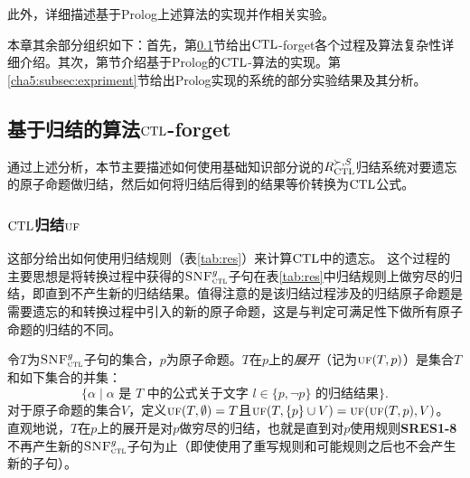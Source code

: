 此外，详细描述基于Prolog上述算法的实现并作相关实验。

本章其余部分组织如下：首先，第\ref{cha5:subsec:resf}节给出$\textrm{CTL}$-forget各个过程及算法复杂性详细介绍。其次，第\label{cha5:subsec:prolog}节介绍基于Prolog的$\textrm{CTL}$-算法的实现。第\ref{cha5:subsec:expriment}节给出Prolog实现的系统的部分实验结果及其分析。
\subsection{基于归结的算法$\textrm{CTL}$-forget}
\label{cha5:subsec:resf}
通过上述分析，本节主要描述如何使用基础知识部分说的$R_{\textrm{CTL}}^{\succ,S}$归结系统对要遗忘的原子命题做归结，然后如何将归结后得到的结果等价转换为$\textrm{CTL}$公式。
\subsubsection{$\textrm{CTL}$归结$\textsc{uf}$}

这部分给出如何使用归结规则（表\ref{tab:res}）来计算$\textrm{CTL}$中的遗忘。
这个过程的主要思想是将转换过程中获得的${\textsc{SNF}_{\textsc{ctl}}^g}$子句在表\ref{tab:res}中归结规则上做穷尽的归结，即直到不产生新的归结结果。值得注意的是该归结过程涉及的归结原子命题是需要遗忘的和转换过程中引入的新的原子命题，这是与判定可满足性下做所有原子命题的归结的不同。

令$T$为${\textsc{SNF}_{\textsc{ctl}}^g}$子句的集合，$p$为原子命题。$T$在$p$上的\emph{展开}（记为$\textsc{uf}(T,p)$）是集合$T$和如下集合的并集：
\[\{\alpha\mid \mbox{$\alpha$ 是 $T$ 中的公式关于文字 $l\in\{p,\neg p\}$ 的归结结果}\}.  \]
对于原子命题的集合$V$，定义$\textsc{uf}(T,\emptyset)=T$且$\textsc{uf}(T,\{p\}\cup V)=\textsc{uf}(\textsc{uf}(T,p), V)$。
直观地说，$T$在$p$上的展开是对$p$做穷尽的归结，也就是直到对$p$使用规则{\bf SRES1-8}不再产生新的${\textsc{SNF}_{\textsc{ctl}}^g}$子句为止（即使使用了重写规则和可能规则之后也不会产生新的子句）。


